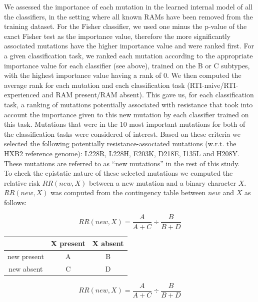 \documentclass[
  11,
]{scrbook}
\begin{document}
We assessed the importance of each mutation in the learned internal
model of all the classifiers, in the setting where all known RAMs have
been removed from the training dataset. For the Fisher classifier, we
used one minus the p-value of the exact Fisher test as the importance
value, therefore the more significantly associated mutations have the
higher importance value and were ranked first. For a given
classification task, we ranked each mutation according to the
appropriate importance value for each classifier (see above), trained on
the B or C subtypes, with the highest importance value having a rank of 0. We then computed the average rank for each mutation and each
classification task (RTI-naive/RTI-experienced and RAM present/RAM
absent). This gave us, for each classification task, a ranking of
mutations potentially associated with resistance that took into account
the importance given to this new mutation by each classifier trained on
this task. Mutations that were in the 10 most important mutations for
both of the classification tasks were considered of interest. Based on
these criteria we selected the following potentially
resistance-associated mutations (w.r.t. the HXB2 reference genome):
L228R, L228H, E203K, D218E, I135L and H208Y. These mutations are
referred to as ``new mutations'' in the rest of this study.\\
To check the epistatic nature of these selected mutations we computed
the relative risk \(RR(new, X)\) between a new mutation and a binary
character \(X\). \(RR(new,X)\) was computed from the contingency table
between \(new\) and \(X\) as follows:

\begin{htmlonly}
\[
RR(new,X) = \frac{A}{A+C} \div \frac{B}{B+D}
\]

\end{htmlonly}

\begin{minipage}{0.45\textwidth}
    \bigskip
    \begin{tabular}{ccc}
                    & X present & X absent\\ \midrule
        new present & A         & B       \\
        new absent  & C         & D       \\ \bottomrule
    \end{tabular}
\end{minipage}
\begin{minipage}{0.45\textwidth}
    \begin{equation*}
        RR(new,X) = \frac{A}{A+C} \div \frac{B}{B+D}
    \end{equation*}
\end{minipage}
\bigskip
\end{document}
